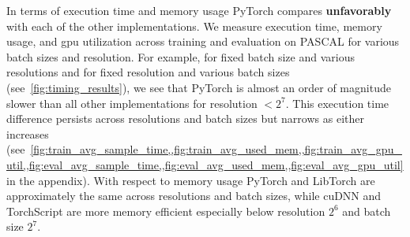 In terms of execution time and memory usage PyTorch compares \textbf{unfavorably} with each of the other implementations.
We measure execution time, memory usage, and gpu utilization across training and evaluation on PASCAL for various batch sizes and resolution.
For example, for fixed batch size and various resolutions and for fixed resolution and various batch sizes (see~\cref{fig:timing_results}), we see that PyTorch is almost an order of magnitude slower than all other implementations for resolution $< 2^7$.
This execution time difference persists across resolutions and batch sizes but narrows as either increases (see~\cref{fig:train_avg_sample_time,,fig:train_avg_used_mem,,fig:train_avg_gpu_util,,fig:eval_avg_sample_time,,fig:eval_avg_used_mem,,fig:eval_avg_gpu_util} in the appendix).
With respect to memory usage PyTorch and LibTorch are approximately the same across resolutions and batch sizes, while cuDNN and TorchScript are more memory efficient especially below resolution $2^6$ and batch size $2^7$.

